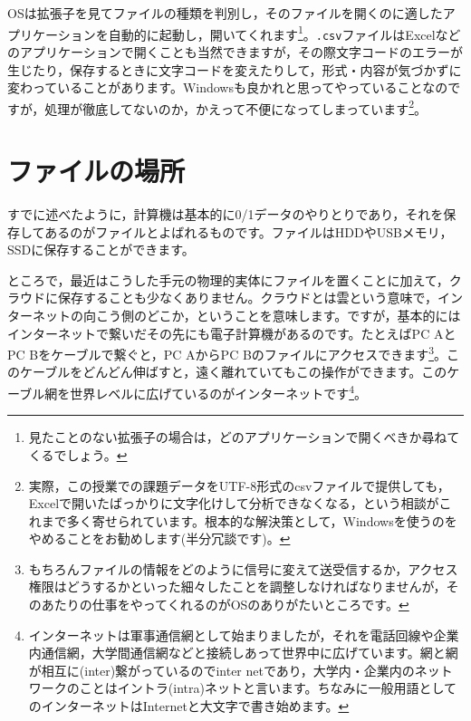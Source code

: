 \documentclass{ltjsbook}
\begin{document}
OSは拡張子を見てファイルの種類を判別し，そのファイルを開くのに適したアプリケーションを自動的に起動し，開いてくれます\footnote{見たことのない拡張子の場合は，どのアプリケーションで開くべきか尋ねてくるでしょう。}。\texttt{.csv}ファイルはExcelなどのアプリケーションで開くことも当然できますが，その際文字コードのエラーが生じたり，保存するときに文字コードを変えたりして，形式・内容が気づかずに変わっていることがあります。Windowsも良かれと思ってやっていることなのですが，処理が徹底してないのか，かえって不便になってしまっています\footnote{実際，この授業での課題データをUTF-8形式のcsvファイルで提供しても，Excelで開いたばっかりに文字化けして分析できなくなる，という相談がこれまで多く寄せられています。根本的な解決策として，Windowsを使うのをやめることをお勧めします(半分冗談です)。}。

\section{ファイルの場所}
すでに述べたように，計算機は基本的に0/1データのやりとりであり，それを保存してあるのがファイルとよばれるものです。ファイルはHDDやUSBメモリ，SSDに保存することができます。

ところで，最近はこうした手元の物理的実体にファイルを置くことに加えて，クラウドに保存することも少なくありません。クラウドとは雲という意味で，インターネットの向こう側のどこか，ということを意味します。ですが，基本的にはインターネットで繋いだその先にも電子計算機があるのです。たとえばPC AとPC Bをケーブルで繋ぐと，PC AからPC Bのファイルにアクセスできます\footnote{もちろんファイルの情報をどのように信号に変えて送受信するか，アクセス権限はどうするかといった細々したことを調整しなければなりませんが，そのあたりの仕事をやってくれるのがOSのありがたいところです。}。このケーブルをどんどん伸ばすと，遠く離れていてもこの操作ができます。このケーブル網を世界レベルに広げているのがインターネットです\footnote{インターネットは軍事通信網として始まりましたが，それを電話回線や企業内通信網，大学間通信網などと接続しあって世界中に広げています。網と網が相互に(inter)繋がっているのでinter netであり，大学内・企業内のネットワークのことはイントラ(intra)ネットと言います。ちなみに一般用語としてのインターネットはInternetと大文字で書き始めます。}。
\end{document}
